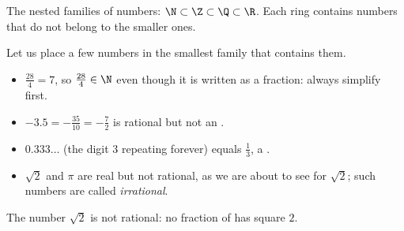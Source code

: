 \begin{omfigure}

{\small The nested families of numbers: $\N \subset \Z \subset \Q \subset
\R$. Each ring contains numbers that do not belong to the smaller ones.}
\end{omfigure}

\begin{example}\label{ex:g10:numbers:classify}
Let us place a few numbers in the smallest family that contains them.
\begin{itemize}
  \item $\frac{28}{4} = 7$, so $\frac{28}{4} \in \N$ even though it is
        written as a fraction: always simplify first.
  \item $-3.5 = -\frac{35}{10} = -\frac72$ is rational but not an .
  \item $0.333\dots$ (the digit $3$ repeating forever) equals $\frac13$,
        a .
  \item $\sqrt 2$ and $\pi$ are real but not rational, as we are about to
        see for $\sqrt 2$; such numbers are called
        \emph{irrational}.
\end{itemize}
\end{example}

\begin{theorem}\label{thm:g10:numbers:sqrt2}
The number $\sqrt 2$ is not rational: no fraction of  has square
$2$.
\end{theorem}

